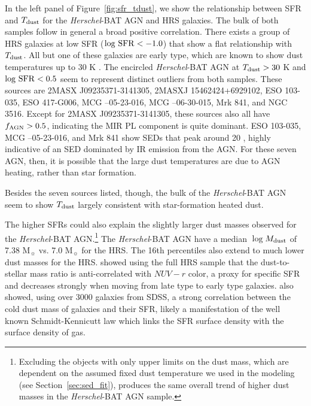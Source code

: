 \documentclass[fleqn, usenatbib]{mnras}
\newcommand{\herschel}{\emph{Herschel}}
\newcommand{\msun}{M$_{\sun}$}
\newcommand{\mdust}{$M_{\rm dust}$}
\newcommand{\tdust}{$T_{\rm dust}$}
\begin{document}
In the left panel of Figure~\ref{fig:sfr_tdust}, we show the relationship between SFR and $T_{\rm dust}$ for the \herschel-BAT AGN and HRS galaxies. The bulk of both samples follow in general a broad positive correlation. There exists a group of HRS galaxies at low SFR ($\log\,\rm{SFR} < -1.0$) that show a flat relationship with $T_{\rm dust}$. All but one of these galaxies are early type, which are known to show dust temperatures up to 30 K \citep{Temi:2007ty}. The encircled \herschel-BAT AGN at $T_{\rm dust} > 30$ K and $\log\,\rm{SFR} < 0.5$ seem to represent distinct outliers from both samples. These sources are 2MASX J09235371-3141305, 2MASXJ 15462424+6929102, ESO 103-035, ESO 417-G006, MCG --05-23-016, MCG --06-30-015, Mrk 841, and NGC 3516. Except for 2MASX J09235371-3141305, these sources also all have $f_{\rm AGN} > 0.5$, indicating the MIR PL component is quite dominant. ESO 103-035, MCG --05-23-016, and Mrk 841 show SEDs that peak around 20 \micron, highly indicative of an SED dominated by IR emission from the AGN. For these seven AGN, then, it is possible that the large dust temperatures are due to AGN heating, rather than star formation.

Besides the seven sources listed, though, the bulk of the \herschel-BAT AGN seem to show \tdust{} largely consistent with star-formation heated dust. 

The higher SFRs could also explain the slightly larger dust masses observed for the \herschel-BAT AGN.\footnote{Excluding the objects with only upper limits on the dust mass, which are dependent on the assumed fixed dust temperature we used in the modeling (see Section~\ref{sec:sed_fit}), produces the same overall trend of higher dust masses in the \herschel-BAT AGN sample.} The \herschel-BAT AGN have a median $\log$\mdust{} of 7.38 \msun{} vs. 7.0 \msun{} for the HRS. The 16th percentiles also extend to much lower dust masses for the HRS. \citet{Cortese:2012xy} showed using the full HRS sample that the dust-to-stellar mass ratio is anti-correlated with $NUV-r$ color, a proxy for specific SFR and decreases strongly when moving from late type to early type galaxies. \citet{da-Cunha:2010qf} also showed, using over 3000 galaxies from SDSS, a strong correlation between the cold dust mass of galaxies and their SFR, likely a manifestation of the well known Schmidt-Kennicutt law \citep{Schmidt:1959fj,Kennicutt:1998wl} which links the SFR surface density with the surface density of gas.
\end{document}
